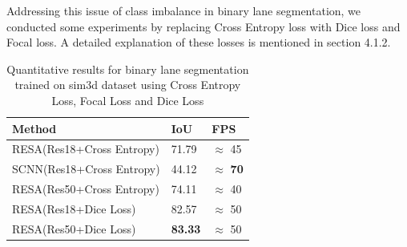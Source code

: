     Addressing this issue of class imbalance in binary lane segmentation, we conducted some experiments by replacing Cross Entropy loss with Dice loss and Focal loss. A detailed explanation of these losses is mentioned in section 4.1.2.
    
     \begin{table}[h!]
    \caption{Quantitative results for binary lane segmentation trained on sim3d \cite{guo2020gen} dataset using Cross Entropy Loss, Focal Loss and Dice Loss}
    \centering
    \begin{tabular}{|l|l|l|}
    \hline
        \textbf{Method} & \textbf{IoU} & \textbf{FPS} \\ \hline
        RESA(Res18+Cross Entropy) \cite{DBLP:journals/corr/abs-2008-13719} & 71.79 & $\approx$ 45 \\ \hline
        SCNN(Res18+Cross Entropy) \cite{pan2018SCNN} & 44.12 & $\approx$ \textbf{70}  \\ \hline
        RESA(Res50+Cross Entropy) \cite{DBLP:journals/corr/abs-2008-13719} & 74.11 & $\approx$ 40  \\ \hline

        RESA(Res18+Dice Loss) \cite{DBLP:journals/corr/abs-2008-13719}& 82.57 & $\approx$ 50 \\\hline
        RESA(Res50+Dice Loss) \cite{DBLP:journals/corr/abs-2008-13719}& \textbf{83.33} & $\approx$ 50 \\\hline
    \end{tabular}
\end{table}
    
